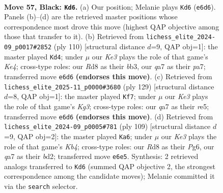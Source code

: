 \documentclass[11pt]{article}
\begin{document}
\clearpage

\begin{figure}[p]\centering
\begin{subfigure}{0.46\textwidth}\centering
\resizebox{\linewidth}{!}{%
\newchessgame
\chessboard[
  setfen={3r4/Q7/4k3/6P1/4P2P/8/8/1K6 b - - 0 57},
  showmover=false,
  pgfstyle=straightmove, color=movearrow, markmove={e6-d6}
]}
\caption{}
\end{subfigure}\hfill
\begin{subfigure}{0.46\textwidth}\centering
\resizebox{\linewidth}{!}{%
\newchessgame
\chessboard[
  setfen={8/pp2k3/2p5/8/4K3/1b6/8/8 w - - 0 56},
  showmover=false,
  pgfstyle=straightmove, color=movearrow, markmove={e4-d4}
]}
\caption{}
\end{subfigure}
\\[4pt]
\begin{subfigure}{0.46\textwidth}\centering
\resizebox{\linewidth}{!}{%
\newchessgame
\chessboard[
  setfen={8/8/6k1/4R3/5PP1/r7/5K2/8 b - - 7 65},
  showmover=false,
  pgfstyle=straightmove, color=movearrow, markmove={g6-f7}
]}
\caption{}
\end{subfigure}\hfill
\begin{subfigure}{0.46\textwidth}\centering
\resizebox{\linewidth}{!}{%
\newchessgame
\chessboard[
  setfen={8/8/6p1/1k6/6P1/Pb3P2/3B4/6K1 b - - 0 55},
  showmover=false,
  pgfstyle=straightmove, color=movearrow, markmove={b5-a6}
]}
\caption{}
\end{subfigure}
\caption{\textbf{Move 57, Black: \texttt{Kd6}.} (a) Our position; Melanie plays \texttt{Kd6} (\texttt{e6d6}). Panels (b)--(d) are the retrieved master positions whose correspondence most drove this move (highest QAP objective among those that transfer to it). (b) Retrieved from \texttt{lichess\_elite\_2024-09\_p0017\#2852} (ply 110) [structural distance $d$=9, QAP obj=1]: the master played \texttt{Kd4}; under $\mu$ our \emph{Ke3} plays the role of that game's \emph{Ke4}; cross-type roles: our \emph{R}d8 as their \emph{b}b3, our \emph{q}a7 as their \emph{p}a7; transferred move \texttt{e6d6} \textbf{(endorses this move)}. (c) Retrieved from \texttt{lichess\_elite\_2025-11\_p0000\#3680} (ply 129) [structural distance $d$=8, QAP obj=1]: the master played \texttt{Kf7}; under $\mu$ our \emph{Ke3} plays the role of that game's \emph{Kg3}; cross-type roles: our \emph{q}a7 as their \emph{r}e5; transferred move \texttt{e6d6} \textbf{(endorses this move)}. (d) Retrieved from \texttt{lichess\_elite\_2024-09\_p0005\#781} (ply 109) [structural distance $d$=9, QAP obj=2]: the master played \texttt{Ka6}; under $\mu$ our \emph{Ke3} plays the role of that game's \emph{Kb4}; cross-type roles: our \emph{R}d8 as their \emph{P}g6, our \emph{q}a7 as their \emph{b}d2; transferred move \texttt{e6e5}. Synthesis: 2 retrieved analogs transferred to \texttt{Kd6} (summed QAP objective 2, the strongest correspondence among the candidate moves); Melanie committed it via the \texttt{search} selector.}
\label{fig:thought-m113}
\end{figure}
\end{document}
